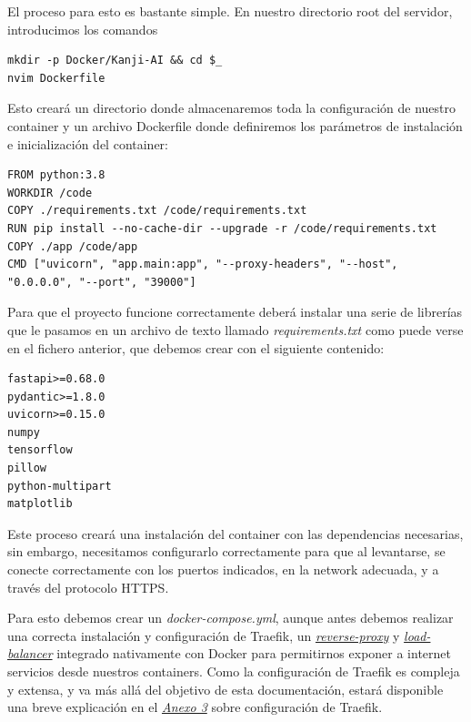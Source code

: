 \documentclass{article}
\begin{document}
\noindent El proceso para esto es bastante simple. En nuestro directorio root del servidor, introducimos los comandos

\noindent\begin{minipage}{\textwidth}
\begin{lstlisting}[numbers=none]
mkdir -p Docker/Kanji-AI && cd $_
nvim Dockerfile
\end{lstlisting}
\end{minipage}
Esto creará un directorio donde almacenaremos toda la configuración de nuestro container y un archivo Dockerfile donde definiremos los parámetros de instalación e inicialización del container:

\noindent\begin{minipage}{\textwidth}
\begin{lstlisting}[numbers=none]
FROM python:3.8
WORKDIR /code
COPY ./requirements.txt /code/requirements.txt
RUN pip install --no-cache-dir --upgrade -r /code/requirements.txt
COPY ./app /code/app
CMD ["uvicorn", "app.main:app", "--proxy-headers", "--host", "0.0.0.0", "--port", "39000"]
\end{lstlisting}
\end{minipage}
Para que el proyecto funcione correctamente deberá instalar una serie de librerías que le pasamos en un archivo de texto llamado \textit{requirements.txt} como puede verse en el fichero anterior, que debemos crear con el siguiente contenido:

\noindent\begin{minipage}{\textwidth}
\begin{lstlisting}[numbers=none]
fastapi>=0.68.0
pydantic>=1.8.0
uvicorn>=0.15.0
numpy
tensorflow
pillow
python-multipart
matplotlib
\end{lstlisting}
\end{minipage}

Este proceso creará una instalación del container con las dependencias necesarias, sin embargo, necesitamos configurarlo correctamente para que al levantarse, se conecte correctamente con los puertos indicados, en la network adecuada, y a través del protocolo HTTPS.

Para esto debemos crear un \textit{docker-compose.yml}, aunque antes debemos realizar una correcta instalación y configuración de Traefik, un \hyperref[sec:terms]{\textit{reverse-proxy}\tec} y \hyperref[sec:terms]{\textit{load-balancer}\tec} integrado nativamente con Docker para permitirnos exponer a internet servicios desde nuestros containers. Como la configuración de Traefik es compleja y extensa, y va más allá del objetivo de esta documentación, estará disponible una breve explicación en el \hyperref[sec:Traefik]{\textit{Anexo 3}} sobre configuración de Traefik.
\end{document}
